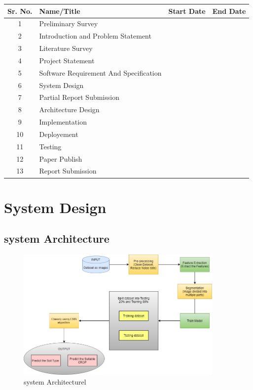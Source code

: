 \documentclass[oneside,a4paper,12pt]{report}
\begin{document}
\begin{center}

\begin{tabular}{|c|p{6cm}|p{3cm}|p{3cm}|}
\hline
\textbf{Sr. No.} & \textbf{Name/Title} & \textbf{Start Date}& \textbf{End Date} \\

\hline
1& Preliminary Survey& &  \\
\hline
2& Introduction and Problem Statement
&  &  \\
\hline
3& Literature Survey&      &   \\
\hline
4& Project Statement
&  & \\
\hline
5& Software Requirement And Specification &    & \\
\hline
6 & System Design &  & \\
\hline
7 & Partial Report Submission &  &     \\
\hline
8 & Architecture Design &      &    \\
\hline
9 & Implementation
 &    & \\
\hline
10 & Deployement &      &   \\
\hline
11 & Testing &  &  \\
\hline
12 & Paper Publish
 &  & \\
\hline
13 & Report Submission
 &  &  \\
\hline

\end{tabular}  
\end{center}


\newpage
\chapter {System Design}
\section {system Architecture}

\begin{figure}[h]
	\centering
		\includegraphics[width=0.90\textwidth]{Crop-Syst-Archi.png}
	\caption {system Architecturel}
	\end{figure}\\
\end{document}
